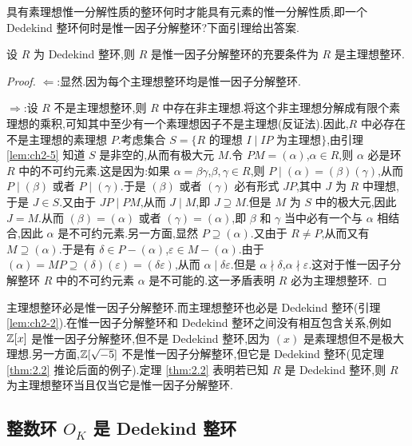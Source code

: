 具有素理想惟一分解性质的整环何时才能具有元素的惟一分解性质,即一个 Dedekind 整环何时是惟一因子分解整环?下面引理给出答案.

\begin{lemma}\label{lem:ch2-8}
设 $R$ 为 Dedekind 整环,则 $R$ 是惟一因子分解整环的充要条件为 $R$ 是主理想整环.
\end{lemma}

\begin{proof}
$\Leftarrow$:显然.因为每个主理想整环均是惟一因子分解整环.

$\Rightarrow$:设 $R$ 不是主理想整环,则 $R$ 中存在非主理想.将这个非主理想分解成有限个素理想的乘积,可知其中至少有一个素理想因子不是主理想(反证法).因此,$R$ 中必存在不是主理想的素理想 $P$.考虑集合 $S=\{R$ 的理想 $I\mid IP$ 为主理想$\}$,由引理 \ref{lem:ch2-5} 知道 $S$ 是非空的,从而有极大元 $M$.令 $PM=(\alpha)$,$\alpha\in R$,则 $\alpha$ 必是环 $R$ 中的不可约元素.这是因为:如果 $\alpha=\beta\gamma$,$\beta,\gamma\in R$,则 $P\mid(\alpha)=(\beta)(\gamma)$,从而 $P\mid(\beta)$ 或者 $P\mid(\gamma)$.于是 $(\beta)$ 或者 $(\gamma)$ 必有形式 $JP$,其中 $J$ 为 $R$ 中理想,于是 $J\in S$.又由于 $JP\mid PM$,从而 $J\mid M$,即 $J\supseteq M$.但是 $M$ 为 $S$ 中的极大元,因此 $J=M$.从而 $(\beta)=(\alpha)$ 或者 $(\gamma)=(\alpha)$,即 $\beta$ 和 $\gamma$ 当中必有一个与 $\alpha$ 相结合,因此 $\alpha$ 是不可约元素.另一方面,显然 $P\supseteq(\alpha)$.又由于 $R\neq P$,从而又有 $M\supseteq(\alpha)$.于是有 $\delta\in P-(\alpha)$,$\varepsilon\in M-(\alpha)$.由于 $(\alpha)=MP\supseteq(\delta)(\varepsilon)=(\delta\varepsilon)$,从而 $\alpha\mid\delta\varepsilon$.但是 $\alpha\nmid\delta$,$\alpha\nmid\varepsilon$.这对于惟一因子分解整环 $R$ 中的不可约元素 $\alpha$ 是不可能的.这一矛盾表明 $R$ 必为主理想整环.
\end{proof}

\begin{remark}
主理想整环必是惟一因子分解整环.而主理想整环也必是 Dedekind 整环(引理 \ref{lem:ch2-2}).在惟一因子分解整环和 Dedekind 整环之间没有相互包含关系,例如 $\mathbb{Z}[x]$ 是惟一因子分解整环,但不是 Dedekind 整环,因为 $(x)$ 是素理想但不是极大理想.另一方面,$\mathbb{Z}[\sqrt{-5}]$ 不是惟一因子分解整环,但它是 Dedekind 整环(见定理 \ref{thm:2.2} 推论后面的例子).定理 \ref{thm:2.2} 表明若已知 $R$ 是 Dedekind 整环,则 $R$ 为主理想整环当且仅当它是惟一因子分解整环.
\end{remark}

\subsection{\texorpdfstring{整数环 $O_K$ 是 Dedekind 整环}{整数环 OK 是 Dedekind 整环}}\label{sec:ch2-s1-2}

